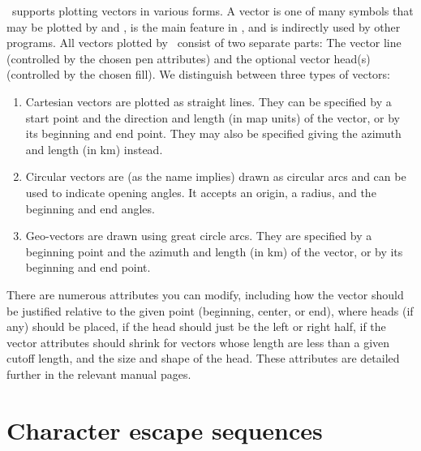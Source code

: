 \GMT\ supports plotting vectors in various forms.  A vector is one of many symbols
that may be plotted by  and , is the main feature
in , and is indirectly used by other programs.  All vectors plotted by \GMT\ consist of two separate
parts: The vector line (controlled by the chosen pen attributes) and the optional
vector head(s) (controlled by the chosen fill).  We distinguish between three types of vectors:
\begin{enumerate}
	\item Cartesian vectors are plotted as straight lines.  They can be specified by a
	start point and the direction and length (in map units) of the vector, or by its beginning and end point.
	They may also be specified giving the azimuth and length (in km) instead.
	
	\item Circular vectors are (as the name implies) drawn as circular arcs and can be used to indicate opening
	angles.  It accepts an origin, a radius, and the beginning and end angles.
	
	\item Geo-vectors are drawn using great circle arcs.  They are specified by a beginning point
	and the azimuth and length (in km) of the vector, or by its beginning and end point.
\end{enumerate}
There are numerous attributes you can modify, including how the vector should be justified relative
to the given point (beginning, center, or end), where heads (if any) should be placed, if the head should just be the
left or right half, if the vector attributes should shrink for vectors whose length are less than a given cutoff
length, and the size and shape of the head.  These attributes are detailed further in the relevant manual pages.

\section{Character escape sequences}
\label{sec:escape}

